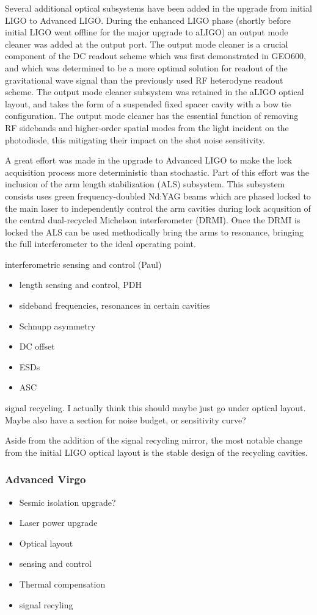 Several additional optical subsystems have been added in the upgrade from initial LIGO to Advanced LIGO. 
During the enhanced LIGO phase (shortly before initial LIGO went offline for the major upgrade to aLIGO) an output
mode cleaner was added at the output port. The output mode cleaner is a crucial component of the DC readout 
scheme which was first demonstrated in GEO600, and which was determined to be a more optimal solution for 
readout of the gravitational wave signal than the previously used RF heterodyne readout scheme. The output mode 
cleaner subsystem was retained in the aLIGO optical layout, and takes the form of a suspended fixed spacer cavity 
with a bow tie configuration. The output mode cleaner has the essential function of removing RF sidebands and higher-order 
spatial modes from the light incident on the photodiode, this mitigating their impact on the shot noise sensitivity. 

A great effort was made in the upgrade to Advanced LIGO to make the lock acquisition process more deterministic than 
stochastic. Part of this effort was the inclusion of the arm length stabilization (ALS) subsystem. This subsystem consists uses 
green frequency-doubled Nd:YAG beams which are phased locked to the main laser to independently control the arm cavities during 
lock acqusition of the central dual-recycled Michelson interferometer (DRMI). Once the DRMI is locked the ALS can be used 
methodically bring the arms to resonance, bringing the full interferometer to the ideal operating point.

interferometric sensing and control (Paul)

\begin{itemize}
\item length sensing and control, PDH
\item sideband frequencies, resonances in certain cavities
\item Schnupp asymmetry
\item DC offset
\item ESDs
\item ASC
\end{itemize}

signal recycling. I actually think this should maybe just go under optical layout.
Maybe also have a section for noise budget, or sensitivity curve?








Aside from the addition of the signal recycling mirror, the most notable change from the initial LIGO optical 
layout is the stable design of the recycling cavities.


\subsubsection{Advanced Virgo}
\begin{itemize}
\item Sesmic isolation upgrade?
\item Laser power upgrade
\item Optical layout
\item sensing and control
\item Thermal compensation
\item signal recyling
\end{itemize}